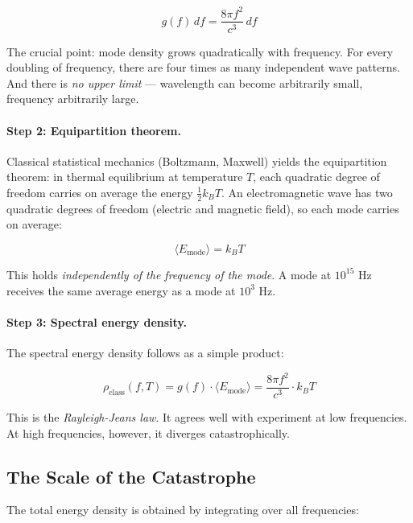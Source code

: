 \begin{equation}
    g(f) \, df = \frac{8\pi f^2}{c^3} \, df
    \label{eq:mode_density}
\end{equation}

The crucial point: mode density grows quadratically with frequency. For every 
doubling of frequency, there are four times as many independent wave patterns. 
And there is \emph{no upper limit} — wavelength can become arbitrarily small, 
frequency arbitrarily large.

\paragraph{Step 2: Equipartition theorem.}
Classical statistical mechanics (Boltzmann, Maxwell) yields the equipartition 
theorem: in thermal equilibrium at temperature $T$, each quadratic degree of freedom 
carries on average the energy $\frac{1}{2} k_B T$. An electromagnetic wave has two 
quadratic degrees of freedom (electric and magnetic field), so each mode carries on 
average:

\begin{equation}
    \langle E_{\text{mode}} \rangle = k_B T
    \label{eq:equipartition}
\end{equation}

This holds \emph{independently of the frequency of the mode}. A mode at $10^{15}$ Hz 
receives the same average energy as a mode at $10^3$ Hz.

\paragraph{Step 3: Spectral energy density.}
The spectral energy density follows as a simple product:

\begin{equation}
    \rho_{\text{class}}(f, T) = g(f) \cdot \langle E_{\text{mode}} \rangle 
    = \frac{8\pi f^2}{c^3} \cdot k_B T
    \label{eq:rayleigh_jeans}
\end{equation}

This is the \emph{Rayleigh-Jeans law}. It agrees well with experiment at low 
frequencies. At high frequencies, however, it diverges catastrophically.

\subsection{The Scale of the Catastrophe}

The total energy density is obtained by integrating over all frequencies:

